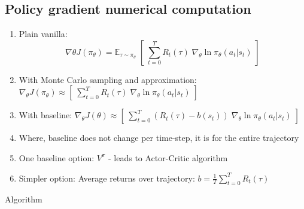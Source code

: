 \documentclass[]{article}
\begin{document}
\subsection{Policy gradient numerical computation}

\begin{enumerate}
	\item Plain vanilla: 
	\begin{equation}
		\nabla \theta J(\pi_\theta) = \mathbb{E}_{\tau \sim \pi_\theta} \; [ \; \sum_{t=0}^T R_t(\tau) \; \nabla_\theta \ln \pi_\theta(a_t \vert s_t) \;]
	\end{equation}
	\item With Monte Carlo sampling and approximation: $\nabla_\theta J(\pi_\theta) \approx [ \; \sum_{t=0}^T R_t(\tau) \; \nabla_\theta \ln \pi_\theta(a_t \vert s_t) \;]$
	\item With baseline: $\nabla_\theta J(\theta) \approx [ \; \sum_{t=0}^T (R_t(\tau) - b(s_t)) \; \nabla_\theta \ln \pi_\theta(a_t \vert s_t) \;]$
	\item Where, baseline does not change per time-step, it is for the entire trajectory
	\item One baseline option: $V^\pi$ - leads to Actor-Critic algorithm
	\item Simpler option: Average returns over trajectory: $b = \frac{1}{T}\sum_{t=0}^T R_t(\tau) $
\end{enumerate}

Algorithm
%
\end{document}
